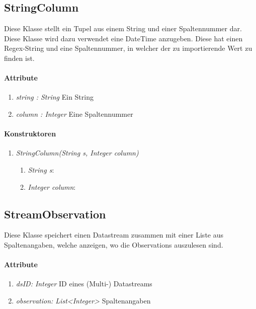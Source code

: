\subsection{StringColumn}
Diese Klasse stellt ein Tupel aus einem String und einer Spaltennummer dar.
Diese Klasse wird dazu verwendet eine DateTime anzugeben. Diese hat einen Regex-String und eine Spaltennummer, in welcher der zu importierende Wert zu finden ist.
\paragraph{Attribute}
\begin{enumerate}[-]
	\item \textit{string : String} Ein String
	\item \textit{column : Integer} Eine Spaltennummer
\end{enumerate} 

\paragraph{Konstruktoren}
\begin{enumerate}[+]
	\item \textit{StringColumn(String s, Integer column)} \\
	
	\begin{enumerate}[$\bullet$]
		\item \textit{String s}: 
		\item \textit{Integer column}:
	\end{enumerate}
\end{enumerate}







\subsection{StreamObservation}
Diese Klasse speichert einen Datastream zusammen mit einer Liste aus Spaltenangaben, welche anzeigen, wo die Observations auszulesen sind.
\paragraph{Attribute} 
\begin{enumerate}[-]
	\item \textit{dsID: Integer} ID eines (Multi-) Datastreams
	\item \textit{observation: List<Integer>} Spaltenangaben
\end{enumerate}

